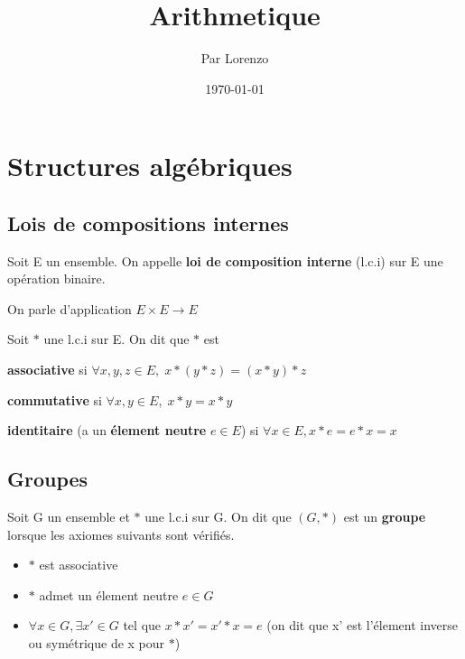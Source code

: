 \documentclass[a4paper, 12pt]{article}
\title{Arithmetique}
\author{Par Lorenzo}
\date{\today}
\begin{document}
\maketitle

\tableofcontents







\section{Structures algébriques}

\subsection{Lois de compositions internes}

\begin{definition}
    Soit E un ensemble. On appelle \textbf{loi de composition interne} (l.c.i) sur E une opération binaire.

    On parle d'application $E \times E \rightarrow E$
\end{definition}

\begin{definition}
    Soit $*$ une l.c.i sur E. On dit que $*$ est

    \item \textbf{associative} si $\forall x, y, z \in E, \; x * (y * z) = (x * y) * z$
    \item \textbf{commutative} si $\forall x, y \in E, \; x * y = x * y$
    \item \textbf{identitaire} (a un \textbf{élement neutre} $e \in E$) si $\forall x \in E, x * e = e * x = x$ 
\end{definition}

\subsection{Groupes}

\begin{definition}
    Soit G un ensemble et $*$ une l.c.i sur G. On dit que $(G, *)$ est un \textbf{groupe} lorsque les axiomes suivants sont vérifiés.

    \begin{itemize}
        \item $*$ est associative
        \item $*$ admet un élement neutre $e \in G$
        \item $\forall x \in G, \exists x' \in G$ tel que $x * x' = x' * x = e$ (on dit que x' est l'élement inverse ou symétrique de x pour $*$)
    \end{itemize}
\end{definition}
\end{document}
